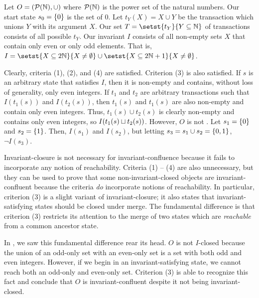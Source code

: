 \begin{example}
  Let $O = (\mathcal{P}(\mathbb{N}), \cup)$ where $\mathcal{P}(\mathbb{N})$ is the power
  set of the natural numbers. Our start state $s_0 = \{0\}$ is the set of
  $0$. Let $t_Y(X) = X \cup Y$ be the transaction which unions $Y$ with its
  argument $X$. Our set $T = \setst{t_Y}{Y \subseteq \nats}$ of transactions
  consists of all possible $t_Y$. Our invariant $I$ consists of all non-empty
  sets $X$ that contain only even or only odd elements. That is, $I = \setst{X
  \subseteq 2\nats}{X \neq \emptyset} \cup \setst{X \subseteq 2\nats + 1}{X
  \neq \emptyset}$.

  Clearly, criteria (1), (2), and (4) are satisfied. Criterion (3) is also
  satisfied. If $s$ is an arbitrary state that satisfies $I$, then it is
  non-empty and contains, without loss of generality, only even integers. If
  $t_1$ and $t_2$ are arbitrary transactions such that $I(t_1(s))$ and
  $I(t_2(s))$, then $t_1(s)$ and $t_1(s)$ are also non-empty and contain only
  even integers. Thus, $t_1(s) \cup t_2(s)$ is clearly non-empty and contains
  only even integers, so $I(t_1(s) \sqcup t_2(s))$.
  However, $O$ is not \Iclosed{}. Let $s_1 = \{0\}$ and $s_2 = \{1\}$.
  Then, $I(s_1)$ and $I(s_2)$, but letting $s_3 = s_1 \cup s_2 = \{0, 1\}$,
  $\lnot I(s_3)$.
\end{example}

{}

Invariant-closure is not necessary for invariant-confluence because it fails to
incorporate any notion of reachability. Criteria (1) -- (4) are also
unnecessary, but they can be used to prove that some non-invariant-closed
objects are invariant-confluent because the criteria \emph{do} incorporate
notions of reachability. In particular, criterion (3) is a slight variant of
invariant-closure; it also states that invariant-satisfying states should be
closed under merge. The fundamental difference is that criterion (3) restricts
its attention to the merge of two states which are \emph{reachable} from a
common ancestor state.

In , we saw this fundamental difference rear its head. $O$
is not $I$-closed because the union of an odd-only set with an even-only set is
a set with both odd and even integers. However, if we begin in an
invariant-satisfying state, we cannot reach both an odd-only and even-only set.
Criterion (3) is able to recognize this fact and conclude that $O$ is
invariant-confluent despite it not being invariant-closed.


